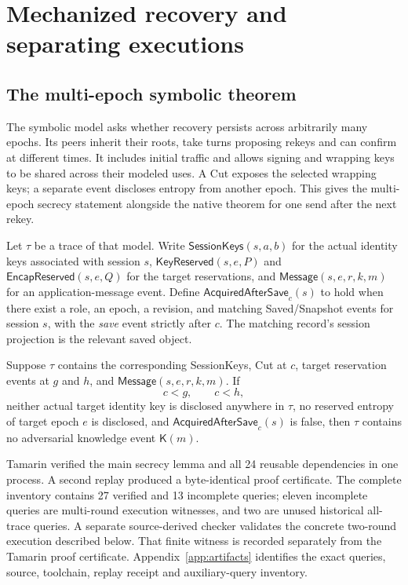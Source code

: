 \section{Mechanized recovery and separating executions}
\label{sec:established}

\subsection{The multi-epoch symbolic theorem}

The symbolic model asks whether recovery persists across arbitrarily
many epochs. Its peers inherit their roots, take turns proposing rekeys
and can confirm at different times. It includes initial traffic and
allows signing and wrapping keys to be shared across their modeled
uses. A \textsf{Cut} exposes the selected wrapping keys; a separate
event discloses entropy from another epoch. This gives the multi-epoch
secrecy statement alongside the native theorem for one send after the
next rekey.

Let $\tau$ be a trace of that model. Write
$\mathsf{SessionKeys}(s,a,b)$ for the actual identity keys associated with session
$s$, $\mathsf{KeyReserved}(s,e,P)$ and $\mathsf{EncapReserved}(s,e,Q)$ for the
target reservations, and $\mathsf{Message}(s,e,r,k,m)$ for an application-message
event. Define $\mathsf{AcquiredAfterSave}_c(s)$ to hold when there exist a role,
an epoch, a revision, and matching \textsf{Saved}/\textsf{Snapshot} events for
session $s$, with the \emph{save} event strictly after $c$. The matching record's
session projection is the relevant saved object.

\begin{theorem}
\label{thm:symbolic}
Suppose $\tau$ contains the corresponding \textsf{SessionKeys}, \textsf{Cut}
at $c$, target reservation events at $g$ and $h$, and
$\mathsf{Message}(s,e,r,k,m)$. If
\[
 c<g,\qquad c<h,
\]
neither actual target identity key is disclosed anywhere in $\tau$, no reserved
entropy of target epoch $e$ is disclosed, and
$\mathsf{AcquiredAfterSave}_c(s)$ is false, then $\tau$ contains no adversarial
knowledge event $\mathsf K(m)$.
\end{theorem}

Tamarin verified the main secrecy lemma and all 24 reusable dependencies
in one process. A second replay produced a byte-identical proof certificate.
The complete inventory contains 27 verified and 13 incomplete queries;
eleven incomplete queries are multi-round execution witnesses, and two
are unused historical all-trace queries. A separate source-derived checker
validates the concrete two-round execution described below. That finite
witness is recorded separately from the Tamarin proof certificate.
Appendix~\ref{app:artifacts} identifies the exact queries, source, toolchain,
replay receipt and auxiliary-query inventory.

